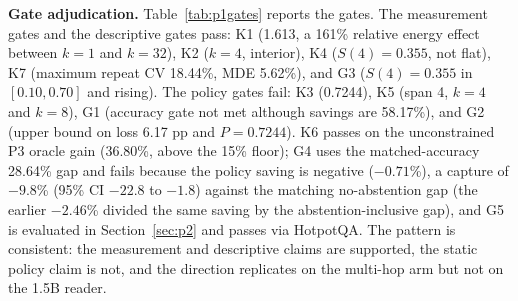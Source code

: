 \documentclass[a4paper,fleqn]{cas-sc}
\begin{document}
\textbf{Gate adjudication.} Table~\ref{tab:p1gates} reports the gates. The measurement gates and the descriptive gates pass: K1 (1.613, a 161\% relative energy effect between $k=1$ and $k=32$), K2 ($k=4$, interior), K4 ($S(4)=0.355$, not flat), K7 (maximum repeat CV 18.44\%, MDE 5.62\%), and G3 ($S(4)=0.355$ in $[0.10,0.70]$ and rising). The policy gates fail: K3 (0.7244), K5 (span 4, $k=4$ and $k=8$), G1 (accuracy gate not met although savings are 58.17\%), and G2 (upper bound on loss 6.17 pp and $P=0.7244$). K6 passes on the unconstrained P3 oracle gain (36.80\%, above the 15\% floor); G4 uses the matched-accuracy 28.64\% gap and fails because the policy saving is negative ($-0.71$\%), a capture of $-9.8$\% (95\% CI $-22.8$ to $-1.8$) against the matching no-abstention gap (the earlier $-2.46$\% divided the same saving by the abstention-inclusive gap), and G5 is evaluated in Section~\ref{sec:p2} and passes via HotpotQA. The pattern is consistent: the measurement and descriptive claims are supported, the static policy claim is not, and the direction replicates on the multi-hop arm but not on the 1.5B reader.
\end{document}
